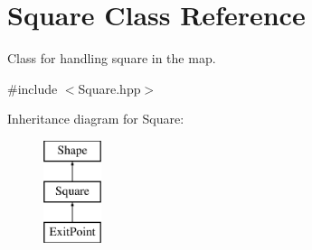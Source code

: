 \hypertarget{class_square}{}\section{Square Class Reference}
\label{class_square}


Class for handling square in the map.  




{\ttfamily \#include $<$Square.\+hpp$>$}

Inheritance diagram for Square\+:\begin{figure}[H]
\begin{center}
\leavevmode
\includegraphics[height=3.000000cm]{class_square}
\end{center}
\end{figure}
